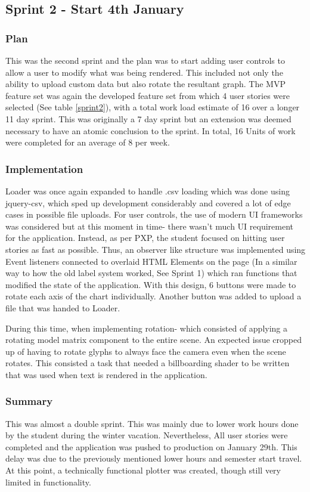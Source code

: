 \subsection{Sprint 2 - Start 4th January}
\subsubsection{Plan}
This was the second sprint and the plan was to start adding user controls to allow a user to modify what was being rendered. This included not only the ability to upload custom data but also rotate the resultant graph. The MVP feature set was again the developed feature set from which 4 user stories were selected (See table \ref{sprint2}), with a total work load estimate of 16 over a longer 11 day sprint. This was originally a 7 day sprint but an extension was deemed necessary to have an atomic conclusion to the sprint. In total, 16 Units of work were completed for an average of 8 per week.

\subsubsection{Implementation}
Loader was once again expanded to handle .csv loading which was done using jquery-csv, which sped up development considerably and covered a lot of edge cases in possible file uploads. For user controls, the use of modern UI frameworks was considered but at this moment in time- there wasn't much UI requirement for the application. Instead, as per PXP, the student focused on hitting user stories as fast as possible. Thus, an observer like structure was implemented using Event listeners connected to overlaid HTML Elements on the page (In a similar way to how the old label system worked, See Sprint 1) which ran functions that modified the state of the application. With this design, 6 buttons were made to rotate each axis of the chart individually. Another button was added to upload a file that was handed to Loader.

During this time, when implementing rotation- which consisted of applying a rotating model matrix component to the entire scene. An expected issue cropped up of having to rotate glyphs to always face the camera even when the scene rotates. This consisted a task that needed a billboarding shader to be written that was used when text is rendered in the application.

\subsubsection{Summary}
This was almost a double sprint. This was mainly due to lower work hours done by the student during the winter vacation. Nevertheless, All user stories were completed and the application was pushed to production on January 29th. This delay was due to the previously mentioned lower hours and semester start travel. At this point, a technically functional plotter was created, though still very limited in functionality.


